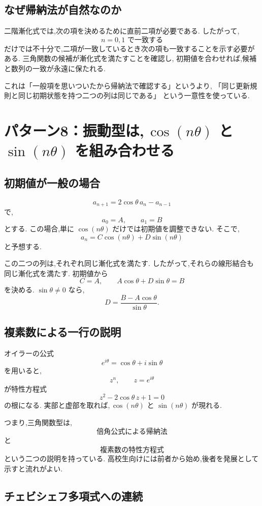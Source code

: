 \subsection{なぜ帰納法が自然なのか}

二階漸化式では,次の項を決めるために直前二項が必要である.
したがって,
\[
  n=0,1\text{ で一致する}
\]
だけでは不十分で,二項が一致しているとき次の項も一致することを示す必要がある.
三角関数の候補が漸化式を満たすことを確認し,
初期値を合わせれば,候補と数列の一致が永遠に保たれる.

これは「一般項を思いついたから帰納法で確認する」というより,
「同じ更新規則と同じ初期状態を持つ二つの列は同じである」
という一意性を使っている.

\section{パターン8：振動型は,\,$\cos(n\theta)$ と $\sin(n\theta)$ を組み合わせる}

\subsection{初期値が一般の場合}

\[
  a_{n+1}=2\cos\theta\,a_n-a_{n-1}
\]
で,
\[
  a_0=A,\qquad a_1=B
\]
とする.
この場合,単に $\cos(n\theta)$ だけでは初期値を調整できない.
そこで,
\[
  a_n=C\cos(n\theta)+D\sin(n\theta)
\]
と予想する.

この二つの列は,それぞれ同じ漸化式を満たす.
したがって,それらの線形結合も同じ漸化式を満たす.
初期値から
\[
  C=A,\qquad
  A\cos\theta+D\sin\theta=B
\]
を決める.
$\sin\theta\neq0$ なら,
\[
  D=\frac{B-A\cos\theta}{\sin\theta}.
\]

\subsection{複素数による一行の説明}

オイラーの公式
\[
  e^{i\theta}=\cos\theta+i\sin\theta
\]
を用いると,
\[
  z^n,\qquad z=e^{i\theta}
\]
が特性方程式
\[
  z^2-2\cos\theta\,z+1=0
\]
の根になる.
実部と虚部を取れば,\,$\cos(n\theta)$ と $\sin(n\theta)$ が現れる.

つまり,三角関数型は,
\[
  \text{倍角公式による帰納法}
\]
と
\[
  \text{複素数の特性方程式}
\]
という二つの説明を持っている.
高校生向けには前者から始め,後者を発展として示すと流れがよい.

\subsection{チェビシェフ多項式への連続}

